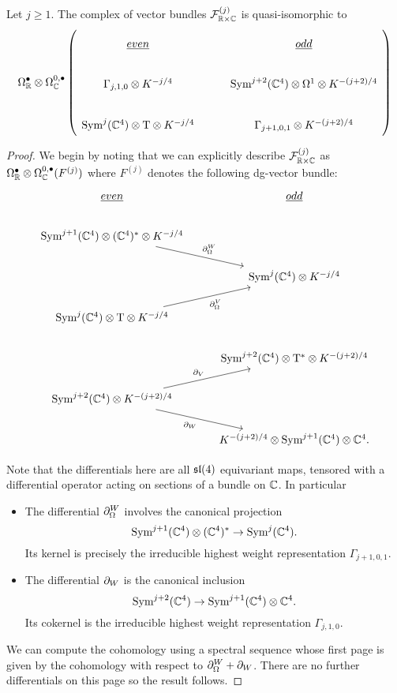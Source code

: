 \begin{prop}
Let $j\geq 1$. The complex of vector bundles $\mathcal{F}^{(j)}_{\mathbb{R}\times \mathbb{C}}$ is quasi-isomorphic to 
\begin{equation}
\Omega^\bullet_\R\otimes \Omega^{0,\bullet}_\C \left (
\begin{tikzcd}
\ul{even} & \ul{odd} \\
\Gamma_{j,1,0} \otimes K^{-j/4} & \Sym^{j+2}(\C^4) \otimes \Omega^1 \otimes K^{-(j+2)/4} \\
\Sym^j (\C^4) \otimes \T \otimes K^{-j/4} & \Gamma_{j+1, 0, 1} \otimes K^{-(j+2)/4}
\end{tikzcd} \right )
\end{equation}


\end{prop}
\begin{proof}
We begin by noting that we can explicitly describe $\mathcal{F}_{\mathbb{R}\times \mathbb{C}}^{(j)}$ as $\Omega^\bullet _{\mathbb{R}} \otimes \Omega^{0,\bullet}_{\mathbb{C}} (F^{(j)})$ where $F^{(j)}$ denotes the following dg-vector bundle:
\begin{equation}
\begin{tikzcd}
\ul{even} & \ul{odd} \\
\Sym^{j+1} (\C^4) \otimes (\C^4)^* \otimes K^{-j/4} \ar[dr, "\del^W_\Omega"] \\ & \Sym^j (\C^4) \otimes K^{-j/4} \\ 
\Sym^j (\C^4) \otimes \T \otimes K^{-j/4} \ar[ur, "\del^V_\Omega"'] & \\
& \Sym^{j+2}(\C^4) \otimes \T^*\otimes K^{-(j+2)/4}\\ 
\Sym^{j+2} (\C^4) \otimes K^{-(j+2)/4}\ar[ur, "\del_V"] \ar[dr, "\del_W"'] \\
& K^{-(j+2)/4}\otimes \Sym^{j+1}(\C^4) \otimes \C^4 . 
\end{tikzcd}
\end{equation}

Note that the differentials here are all $\mathfrak{sl}(4)$ equivariant maps, tensored with a differential operator acting on sections of a bundle on $\mathbb{C}$. In particular

\begin{itemize}
\item The differential $\partial^W_\Omega$ involves the canonical projection 
\[\text{Sym}^{j+1} (\mathbb{C}^4)\otimes (\mathbb{C}^4)^* \to \text{Sym}^j (\mathbb{C}^4).\] Its kernel is precisely the irreducible highest weight representation $\Gamma_{j+1, 0 ,1}$.

\item The differential $\partial_W$ is the canonical inclusion 
\[\text{Sym}^{j+2} (\mathbb{C}^4) \to \text{Sym}^{j+1}(\mathbb{C}^4) \otimes \mathbb{C}^4.\] Its cokernel is the irreducible highest weight representation $\Gamma_{j, 1, 0}$.
\end{itemize}

We can compute the cohomology using a spectral sequence whose first page is given by the cohomology with respect to $\partial^W_\Omega + \partial_W$. There are no further differentials on this page so the result follows. 
\end{proof}

